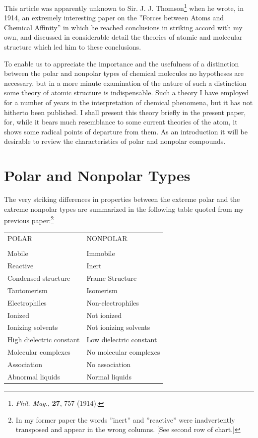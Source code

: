 \documentclass[11pt]{memoir}
\begin{document}
This article was apparently unknown to Sir. J. J. Thomson\footnote{\emph{Phil. Mag.}, \textbf{27}, 757 (1914).} when he wrote, in 1914, an extremely interesting paper on the ''Forces between Atoms and Chemical Affinity'' in which he reached conclusions in striking accord with my own, and discussed in considerable detail the theories of atomic and molecular structure which led him to these conclusions.

To enable us to appreciate the importance and the usefulness of a distinction between the polar and nonpolar types of chemical molecules no hypotheses are necessary, but in a more minute examination of the nature of such a distinction some theory of atomic structure is indispensable.  Such a theory I have employed for a number of years in the interpretation of chemical phenomena, but it has not hitherto been published.  I shall present this theory briefly in the present paper, for, while it bears much resemblance to some current theories of the atom, it shows some radical points of departure from them.  As an introduction it will be desirable to review the characteristics of polar and nonpolar compounds.

\section*{Polar and Nonpolar Types}

The very striking differences in properties between the extreme polar and the extreme nonpolar types are summarized in the following table quoted from my previous paper:\footnote{In my former paper the words ''inert'' and ''reactive'' were inadvertently transposed and appear in the wrong columns. [See second row of chart.]}

\begin{center}
\begin{tabular}{ l l }
	POLAR &  NONPOLAR \\ 
	  & \\
	Mobile & Immobile \\ 
	Reactive & Inert  \\
	Condensed structure & Frame Structure \\
	Tautomerism & Isomerism  \\
	Electrophiles & Non-electrophiles \\
	Ionized & Not ionized \\
	Ionizing solvents & Not ionizing solvents \\
	High dielectric constant & Low dielectric constant \\
	Molecular complexes & No molecular complexes \\
	Association & No association \\
	Abnormal liquids & Normal liquids \\
	
\end{tabular} \vspace{5mm}
\end{center}
\end{document}
